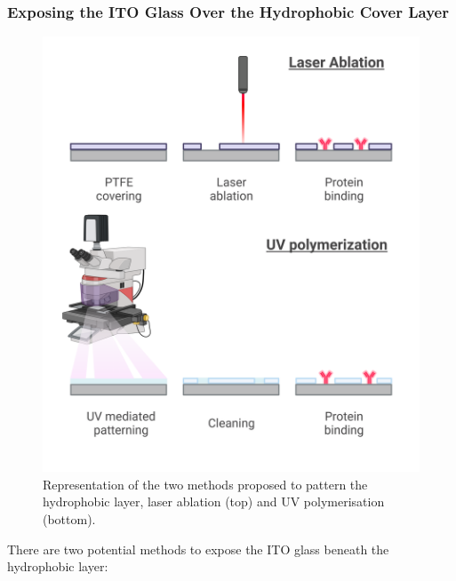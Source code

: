 \documentclass[8pt, twocolumn]{article}
\begin{document}
\subsubsection*{Exposing the ITO Glass Over the Hydrophobic Cover Layer}


\begin{figure}[!b]
  \centering
  \includegraphics[width=\linewidth]{img/3.png}
  \caption{Representation of the two methods proposed to pattern the hydrophobic layer, laser ablation (top) and UV polymerisation (bottom).}
  \label{fig:methods}
\end{figure}

There are two potential methods to expose the ITO glass beneath the hydrophobic layer:
\end{document}
